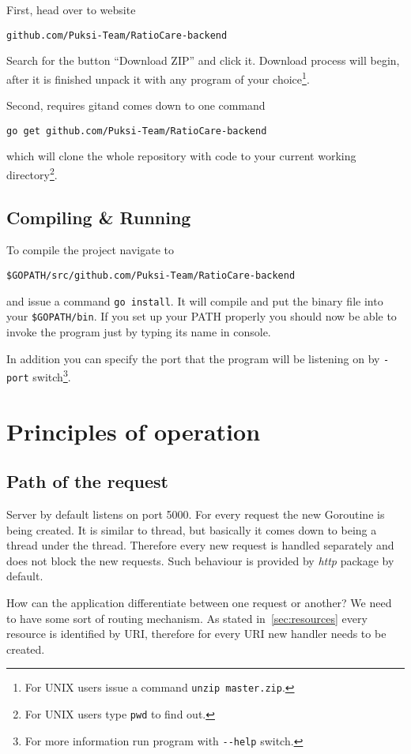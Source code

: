 First, head over to website
\begin{verbatim}
github.com/Puksi-Team/RatioCare-backend
\end{verbatim}
Search for the button ``Download ZIP'' and click it. Download process will begin, after it is finished unpack it with any program of your choice\cprotect\footnote{For UNIX users issue a command \verb|unzip master.zip|.}.

Second, requires git and comes down to one command
\begin{verbatim}
go get github.com/Puksi-Team/RatioCare-backend
\end{verbatim}
which will clone the whole repository with code to your current working directory\cprotect\footnote{For UNIX users type \verb|pwd| to find out.}.

\subsection{Compiling \& Running}
To compile the project navigate to
\begin{verbatim}
$GOPATH/src/github.com/Puksi-Team/RatioCare-backend
\end{verbatim}
and issue a command \verb|go install|. It will compile and put the binary file into your \verb|$GOPATH/bin|. If you set up your PATH properly you should now be able to invoke the program just by typing its name in console.

In addition you can specify the port that the program will be listening on by \verb|-port| switch\cprotect\footnote{For more information run program with \verb|--help| switch.}.

\section{Principles of operation}

\subsection{Path of the request}
Server by default listens on port 5000. For every request the new Goroutine\cite{Goroutines-go} is being created. It is similar to thread, but basically it comes down to being a thread under the thread. Therefore every new request is handled separately and does not block the new requests. Such behaviour is provided by \textit{http}\cite{HTTP-go} package by default.

How can the application differentiate between one request or another? We need to have some sort of routing mechanism. As stated in~\ref{sec:resources} every resource is identified by URI, therefore for every URI new handler needs to be created.

